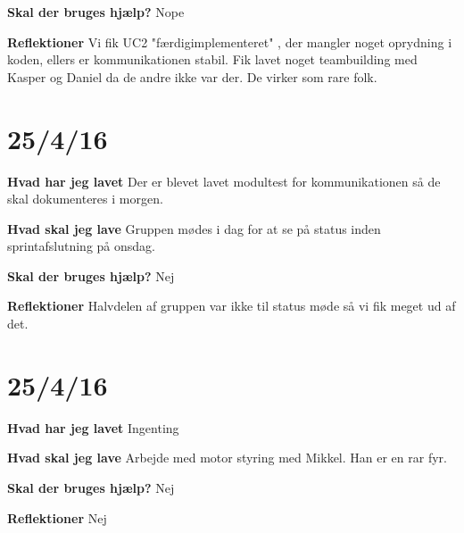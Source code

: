 \documentclass{article}
\begin{document}
	\textbf{Skal der bruges hjælp?}
	Nope
	
	\textbf{Reflektioner}
	Vi fik UC2 "færdigimplementeret" , der mangler noget oprydning i koden, ellers er kommunikationen stabil. Fik lavet noget teambuilding med Kasper og Daniel da de andre ikke var der. De virker som rare folk. 
	
	\section{25/4/16}
	\textbf{Hvad har jeg lavet}
	Der er blevet lavet modultest for kommunikationen så de skal dokumenteres i morgen. 
	
	\textbf{Hvad skal jeg lave}
	Gruppen mødes i dag for at se på status inden sprintafslutning på onsdag. 
	
	\textbf{Skal der bruges hjælp?}
	Nej

	
	\textbf{Reflektioner}
	Halvdelen af gruppen var ikke til status møde så vi fik meget ud af det.
	
	\section{25/4/16}
	\textbf{Hvad har jeg lavet}
	Ingenting
	
	\textbf{Hvad skal jeg lave}
	Arbejde med motor styring med Mikkel. Han er en rar fyr. 
	
	\textbf{Skal der bruges hjælp?}
	Nej
	
	
	\textbf{Reflektioner}
	Nej
	
	
\end{document}
